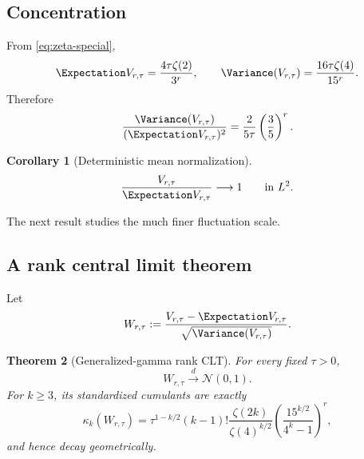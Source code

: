 \documentclass[11pt,oneside]{article}
\newtheorem{theorem}{Theorem}[section]
\newtheorem{corollary}[theorem]{Corollary}
\theoremstyle{definition}
\theoremstyle{remark}
\newcommand{\Normal}{\mathcal N}
\begin{document}
\subsection{Concentration}

From \eqref{eq:zeta-special},
\begin{equation}\label{eq:V-mean-var}
 \Expectation V_{r,\tau}=\frac{4\tau\zeta(2)}{3^r},
 \qquad
 \Variance(V_{r,\tau})=\frac{16\tau\zeta(4)}{15^r}.
\end{equation}
Therefore
\begin{equation}\label{eq:V-relative}
 \frac{\Variance(V_{r,\tau})}{(\Expectation V_{r,\tau})^2}
 =\frac{2}{5\tau}\left(\frac35\right)^r.
\end{equation}

\begin{corollary}[Deterministic mean normalization]\label{cor:V-L2}
\begin{equation}\label{eq:V-L2}
 \frac{V_{r,\tau}}{\Expectation V_{r,\tau}}\longrightarrow1
 \qquad\text{in }L^2.
\end{equation}
\end{corollary}

The next result studies the much finer fluctuation scale.

\subsection{A rank central limit theorem}

Let
\begin{equation}\label{eq:W-def}
 W_{r,\tau}:=
 \frac{V_{r,\tau}-\Expectation V_{r,\tau}}
 {\sqrt{\Variance(V_{r,\tau})}}.
\end{equation}

\begin{theorem}[Generalized-gamma rank CLT]\label{thm:gamma-CLT}
For every fixed $\tau>0$,
\begin{equation}\label{eq:gamma-CLT}
 W_{r,\tau}\xrightarrow{d}\Normal(0,1).
\end{equation}
For $k\geq3$, its standardized cumulants are exactly
\begin{equation}\label{eq:gamma-standardized}
 \kappa_k(W_{r,\tau})
 =\tau^{1-k/2}(k-1)!
 \frac{\zeta(2k)}{\zeta(4)^{k/2}}
 \left(\frac{15^{k/2}}{4^k-1}\right)^r,
\end{equation}
and hence decay geometrically.
\end{theorem}
\end{document}
